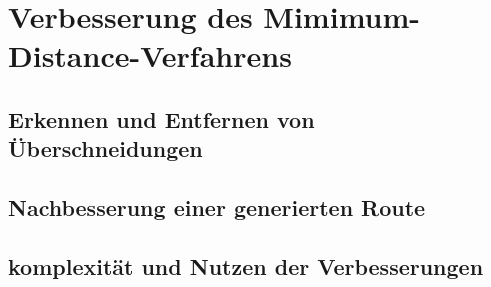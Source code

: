 \chapter{Verbesserung des Mimimum-Distance-Verfahrens}

\section{Erkennen und Entfernen von Überschneidungen}

\section{Nachbesserung einer generierten Route}

\section{komplexität und Nutzen der Verbesserungen}

